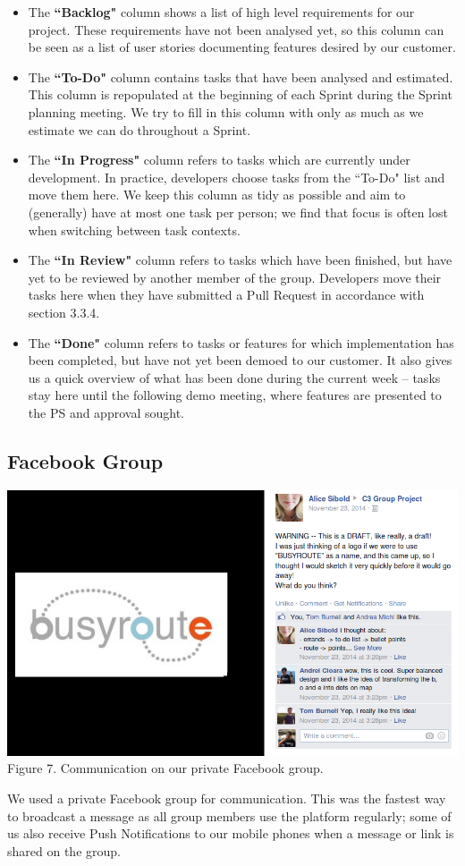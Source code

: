 \documentclass[a4paper, 10pt]{report}
\begin{document}
\begin{itemize}
\item The \textbf{``Backlog"} column shows a list of high level requirements for our project. These requirements have not been analysed yet, so this column can be seen as a list of user stories documenting features desired by our customer.
\item The \textbf{``To-Do"} column contains tasks that have been analysed and estimated. This column is repopulated at the beginning of each Sprint during the Sprint planning meeting. We try to fill in this column with only as much as we estimate we can do throughout a Sprint.
\item The \textbf{``In Progress"} column refers to tasks which are currently under development. In practice, developers choose tasks from the ``To-Do" list and move them here. We keep this column as tidy as possible and aim to (generally) have at most one task per person; we find that focus is often lost when switching between task contexts.
\item The \textbf{``In Review"} column refers to tasks which have been finished, but have yet to be reviewed by another member of the group. Developers move their tasks here when they have submitted a Pull Request in accordance with section 3.3.4.
\item The \textbf{``Done"} column refers to tasks or features for which implementation has been completed, but have not yet been demoed to our customer. It also gives us a quick overview of what has been done during the current week -- tasks stay here until the following demo meeting, where features are presented to the PS and approval sought.
\end{itemize}
\subsection{Facebook Group}
\begin{center}
\includegraphics[scale=0.3]{facebook_communication.png}\\
Figure 7. Communication on our private Facebook group.
\end{center}
We used a private Facebook group for communication. This was the fastest way to broadcast a message as all group members use the platform regularly; some of us also receive Push Notifications to our mobile phones when a message or link is shared on the group.
\end{document}
